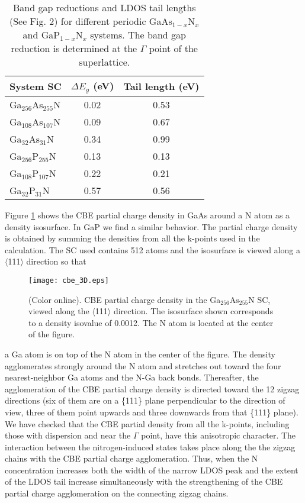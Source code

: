 \documentclass[aps,prb,10pt,twocolumn,groupedaddress]{revtex4-1}
\begin{document}
\begin{center}
  \begin{table}[t]
    \caption{Band gap reductions and LDOS tail lengths (See Fig. 2) 
    for different periodic GaAs$_{1-x}$N$_x$ and GaP$_{1-x}$N$_x$ systems. The
band gap reduction is determined at the $\Gamma$ point of the superlattice.}
    \begin{tabular*}{0.45\textwidth}{@{\extracolsep{\fill}}lcc}
      \hline
      \hline
      System SC  & $\Delta E_g$ (eV) & Tail length (eV)\\
      \hline
      Ga$_{256}$As$_{255}$N & 0.02 & 0.53\\ 
      Ga$_{108}$As$_{107}$N & 0.09 & 0.67\\
      Ga$_{32}$As$_{31}$N & 0.34 & 0.99\\
      \hline
      Ga$_{256}$P$_{255}$N & 0.13 & 0.13\\
      Ga$_{108}$P$_{107}$N & 0.22 & 0.21\\
      Ga$_{32}$P$_{31}$N & 0.57 & 0.56\\
      \hline
      \hline
    \end{tabular*}
    \label{tab:concentrations}
  \end{table}
\end{center}
Figure \ref{fig:cbe_3D} shows the CBE partial charge density in GaAs
around a N atom as a density isosurface. In GaP we find a similar
behavior. The partial charge density is  
obtained by summing the densities from all the k-points used in the calculation.
The SC used contains 512 atoms and the isosurface is viewed along a 
$\langle$111$\rangle$ direction 
so that
\begin{figure}[!b]
  \centering
    \texttt{[image: cbe\_3D.eps]}
    \caption{(Color online). CBE partial charge density in the
Ga$_{256}$As$_{255}$N SC, viewed along the $\langle$111$\rangle$
direction. The isosurface shown corresponds to a density isovalue of 0.0012.
The N atom is located at the center of the figure.}
  \label{fig:cbe_3D}
\end{figure}a Ga atom is on top of the N atom in the  center of the figure.
The density agglomerates strongly around the N atom and stretches
out toward the four nearest-neighbor Ga atoms and the N-Ga back bonds. 
Thereafter, the agglomeration of the CBE partial charge density is directed
toward the 12 zigzag directions (six of them are on a \{111\} plane 
perpendicular
to the direction of view, three of them point upwards and three downwards
from that \{111\} plane). We have checked that the CBE partial density from 
all the k-points, including those with dispersion and near 
the $\Gamma$ point, have this anisotropic character. The interaction 
between the nitrogen-induced states takes place along the the zigzag 
chains
with  the CBE partial charge agglomeration. Thus, when the N concentration 
increases both the width of the narrow LDOS peak and the extent of the
LDOS tail increase simultaneously with the strengthening of the CBE 
partial charge agglomeration on the connecting zigzag chains.
\end{document}
